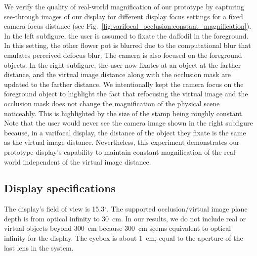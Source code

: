 We verify the quality of real-world magnification of our prototype by capturing see-through images of our display for different display focus settings for a fixed camera focus distance (see Fig.~\ref{fig:varifocal_occlusion:constant_magnification}). In the left subfigure, the user is assumed to fixate the daffodil in the foreground. In this setting, the other flower pot is blurred due to the computational blur that emulates perceived defocus blur. The camera is also focused on the foreground objects. In the right subfigure, the user now fixates at an object at the farther distance, and the virtual image distance along with the occlusion mask are updated to the farther distance. We intentionally kept the camera focus on the foreground object to highlight the fact that refocusing the virtual image and the occlusion mask does not change the magnification of the physical scene noticeably. This is highlighted by the size of the stamp being roughly constant. Note that the user would never see the camera image shown in the right subfigure because, in a varifocal display, the distance of the object they fixate is the same as the virtual image distance. Nevertheless, this experiment demonstrates our prototype display's capability to maintain constant magnification of the real-world independent of the virtual image distance.

\subsection{Display specifications}
The display's field of view is 15.3$^\circ$. The supported occlusion/virtual image plane depth is from optical infinity to 30~cm. In our results, we do not include real or virtual objects beyond 300~cm because 300~cm seems equivalent to optical infinity for the display. The eyebox is about 1~cm, equal to the aperture of the last lens in the system. 
